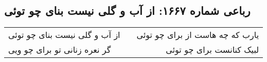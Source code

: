 \begin{center}
\section*{رباعی شماره ۱۶۶۷: از آب و گلی نیست بنای چو توئی}
\label{sec:1667}
\begin{longtable}{l p{0.5cm} r}
از آب و گلی نیست بنای چو توئی
&&
یارب که چه هاست از برای چو توئی
\\
گر نعره زنانی تو برای چو ویی
&&
لبیک کنانست برای چو توئی
\\
\end{longtable}
\end{center}
